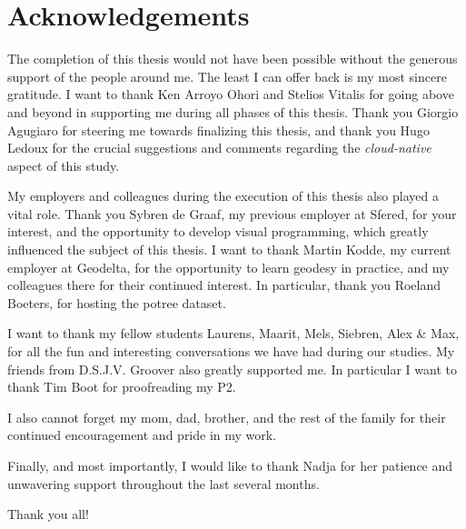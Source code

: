 
\chapter*{Acknowledgements}

The completion of this thesis would not have been possible without the generous support of the people around me. 
The least I can offer back is my most sincere gratitude.
I want to thank Ken Arroyo Ohori and Stelios Vitalis for going above and beyond in supporting me during all phases of this thesis. 
Thank you Giorgio Agugiaro for steering me towards finalizing this thesis, and thank you Hugo Ledoux for the crucial suggestions and comments regarding the \emph{cloud-native} aspect of this study.

My employers and colleagues during the execution of this thesis also played a vital role. 
Thank you Sybren de Graaf, my previous employer at Sfered, for your interest, and the opportunity to develop visual programming, which greatly influenced the subject of this thesis.
I want to thank Martin Kodde, my current employer at Geodelta, for the opportunity to learn geodesy in practice, and my colleagues there for their continued interest. 
In particular, thank you Roeland Boeters, for hosting the potree dataset.

I want to thank my fellow students Laurens, Maarit, Mels, Siebren, Alex \& Max, for all the fun and interesting conversations we have had during our studies. 
My friends from D.S.J.V. Groover also greatly supported me. In particular I want to thank Tim Boot for proofreading my P2.

I also cannot forget my mom, dad, brother, and the rest of the family for their continued encouragement and pride in my work.

Finally, and most importantly, I would like to thank Nadja for her patience and unwavering support  throughout the last several months. 

Thank you all!


